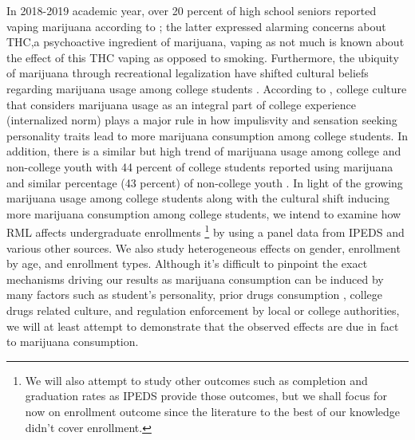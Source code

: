 \documentclass[12pt]{article}%
\begin{document}
In 2018-2019 academic year, over 20 percent of high school seniors reported vaping marijuana according to \cite{National_Institute_on_Drug_Abuse2019-wl}; the latter expressed alarming concerns about THC,a psychoactive ingredient of marijuana, vaping as not much is known about the effect of this THC vaping as opposed to smoking. Furthermore, the ubiquity of marijuana through recreational legalization have shifted cultural beliefs regarding marijuana usage among college students \citep{koval2019perceived}. According to \cite{pearson2018personality}, college culture that considers marijuana usage as an integral part of college experience (internalized norm) plays a major rule in how impulisvity and sensation seeking personality traits lead to more marijuana consumption among college students. In addition, there is a similar but high trend of marijuana usage among college and non-college youth with 44 percent of college students reported using marijuana and similar percentage (43 percent) of non-college youth \citep{schulenberg2021monitoring}.
In light of the growing marijuana usage among college students along with the cultural shift inducing more marijuana consumption among college students, we intend to examine how RML affects undergraduate enrollments 
\footnote{ We will also attempt to study other outcomes such as completion and graduation rates as IPEDS provide those outcomes, but we shall focus for now on enrollment outcome since the literature to the best of our knowledge didn't cover enrollment. }
by using a panel data from IPEDS and various other sources. We also study heterogeneous effects on gender, enrollment by age, and enrollment types. Although it's difficult to pinpoint the exact mechanisms driving our results as marijuana consumption can be induced by many factors such as student's personality, prior drugs consumption , college drugs related culture, and regulation enforcement by local or college authorities, we will at least attempt to demonstrate that the observed effects are due in fact to marijuana consumption. 
\end{document}

